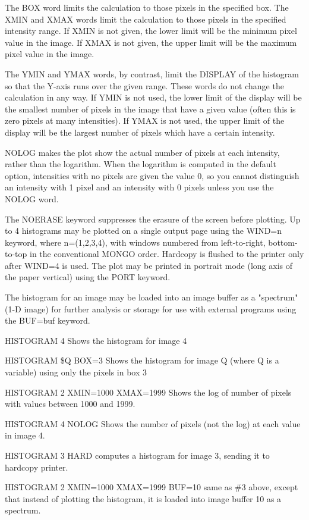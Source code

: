 The BOX word limits the calculation to those pixels in the specified box.
The XMIN and XMAX words limit the calculation to those pixels in the
specified intensity range.  If XMIN is not given, the lower limit will be
the minimum pixel value in the image.  If XMAX is not given, the upper
limit will be the maximum pixel value in the image.

The YMIN and YMAX words, by contrast, limit the DISPLAY of the histogram so
that the Y-axis runs over the given range.  These words do not change the
calculation in any way.  If YMIN is not used, the lower limit of the
display will be the smallest number of pixels in the image that have a
given value (often this is zero pixels at many intensities).  If YMAX is
not used, the upper limit of the display will be the largest number of
pixels which have a certain intensity.
       
NOLOG makes the plot show the actual number of pixels at each intensity,
rather than the logarithm.  When the logarithm is computed in the default
option, intensities with no pixels are given the value 0, so you cannot
distinguish an intensity with 1 pixel and an intensity with 0 pixels unless
you use the NOLOG word.

The NOERASE keyword suppresses the erasure of the screen before plotting.
Up to 4 histograms may be plotted on a single output page using the WIND=n
keyword, where n=(1,2,3,4), with windows numbered from left-to-right,
bottom-to-top in the conventional MONGO order.  Hardcopy is flushed to the
printer only after WIND=4 is used.  The plot may be printed in portrait
mode (long axis of the paper vertical) using the PORT keyword.

The histogram for an image may be loaded into an image buffer as a
"spectrum" (1-D image) for further analysis or storage for use with
external programs using the BUF=buf keyword.

\begin{example}
  \item[HISTOGRAM 4 \hfill]{Shows the histogram for image 4}
  \item[HISTOGRAM \$Q BOX=3 \hfill]{Shows the histogram for image Q 
       (where Q is a variable) using only the pixels in box 3}
  \item[HISTOGRAM 2 XMIN=1000 XMAX=1999 \hfill]{
       Shows the log of number of pixels with values between 1000 and 1999.}
  \item[HISTOGRAM 4 NOLOG \hfill]{
       Shows the number of pixels (not the log) at each value in image 4.}
  \item[HISTOGRAM 3 HARD\hfill]{
       computes a histogram for image 3, sending it to hardcopy printer.}
  \item[HISTOGRAM 2 XMIN=1000 XMAX=1999 BUF=10\hfill]{ same as \#3 above,
       except that instead of plotting the histogram, it is loaded into image
       buffer 10 as a spectrum.}
\end{example}

